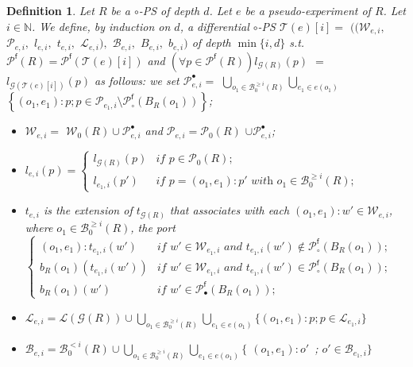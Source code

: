 \documentclass{article}
\newcommand{\target}[1]{t_{#1}}
\theoremstyle{plain}
\newtheorem{definition}{Definition}
\newcommand{\Nat}{\ensuremath{\mathbb{N}}}
\newcommand{\leftwires}[1]{\mathcal{L}(#1)}
\newcommand{\labelofcell}[1]{l_{#1}}
\newcommand{\taylor}[2]{\mathcal{T}(#1)[#2]}
\newcommand{\groundof}[1]{\mathcal{G}(#1)}
\newcommand{\portsatzero}[1]{\mathcal{P}_0(#1)}
\newcommand{\wiresatzero}[1]{\mathcal{W}_0(#1)}
\newcommand{\conclusions}[1]{\mathcal{P}^{\textsf{f}}(#1)}
\newcommand{\conclusionscirc}[1]{\mathcal{P}_\circ^{\textsf{f}}(#1)}
\newcommand{\conclusionsnotcirc}[1]{\mathcal{P}_\bullet^{\textsf{f}}(#1)}
\newcommand{\boxesatzerogeq}[2]{\mathcal{B}_0^{\geq #2}(#1)}
\newcommand{\boxesatzerosmaller}[2]{\mathcal{B}_0^{< #2}(#1)}
\begin{document}
\begin{definition}\label{defin: Taylor}
Let $R$ be a $\circ$-PS of depth $d$. Let $e$ be a pseudo-experiment of $R$. Let $i \in \Nat$. 
We define, by induction on $d$, a differential $\circ$-PS $\taylor{e}{i} = $ $((\mathcal{W}_{e, i},$ $\mathcal{P}_{e, i}, $ $l_{e, i}, $ $t_{e, i}, $ $\mathcal{L}_{e, i}),$ $\mathcal{B}_{e, i},$ $B_{e, i},$ $b_{e, i})$ of depth $\min \{ i, d \}$  s.t. 
$\conclusions{R} = \conclusions{\taylor{e}{i}}$ 
and $(\forall p \in \conclusions{R}) \labelofcell{\groundof{R}}(p) $ $=$ $\labelofcell{\groundof{\taylor{e}{i}}}(p)$ as follows: we set $\mathcal{P}_{e, i}^{\bullet} =$ $\bigcup_{o_1 \in \boxesatzerogeq{R}{i}} \bigcup_{e_1 \in e(o_1)}$ $\left\lbrace (o_1, e_1):p ; p \in \mathcal{P}_{e_1, i} \setminus \conclusionscirc{B_R(o_1)} \right\rbrace$;
\begin{itemize}
\item $\mathcal{W}_{e, i} =$ $\wiresatzero{R} \cup \mathcal{P}_{e, i}^{\bullet}$ and $\mathcal{P}_{e, i} = \portsatzero{R}$ $\cup \mathcal{P}_{e, i}^{\bullet}$;
\item $l_{e, i}(p) = \left\lbrace \begin{array}{ll} \labelofcell{\groundof{R}}(p) & \textit{if $p \in \portsatzero{R}$;}\\ l_{e_1, i}(p') & \textit{if $p = (o_1, e_1) : p'$ with $o_1 \in \boxesatzerogeq{R}{i}$;} \end{array} \right.$
\item $t_{e, i}$ is the extension of $\target{\groundof{R}}$ that associates with each $(o_1, e_1) : w' \in \mathcal{W}_{e, i}$, where $o_1 \in \boxesatzerogeq{R}{i}$, the port $\left\lbrace \begin{array}{ll}  
(o_1, e_1) : t_{e_1, i}(w') & \textit{if $w' \in \mathcal{W}_{e_1, i}$ and $t_{e_1, i}(w') \notin \conclusionscirc{B_R(o_1)}$;}\\
b_R(o_1)(t_{e_1, i}(w')) & \textit{if $w' \in \mathcal{W}_{e_1, i}$ and $t_{e_1, i}(w') \in \conclusionscirc{B_R(o_1)}$;} \\
b_R(o_1)(w') & \textit{if $w' \in \conclusionsnotcirc{B_R(o_1)}$;}
\end{array}\right.$
\item $\mathcal{L}_{e, i} = \leftwires{\groundof{R}} \cup \bigcup_{o_1 \in \boxesatzerogeq{R}{i}} \bigcup_{e_1 \in e(o_1)} \{ (o_1, e_1):p ; p \in \mathcal{L}_{e_1, i} \}$
\item $\mathcal{B}_{e, i} = \boxesatzerosmaller{R}{i} \cup \bigcup_{o_1 \in \boxesatzerogeq{R}{i}} \bigcup_{e_1 \in e(o_1)} \{ $ \mbox{$(o_1, e_1):o'$ ;} $o' \in \mathcal{B}_{e_1, i} \}$

\end{itemize}
\end{definition}
\end{document}

